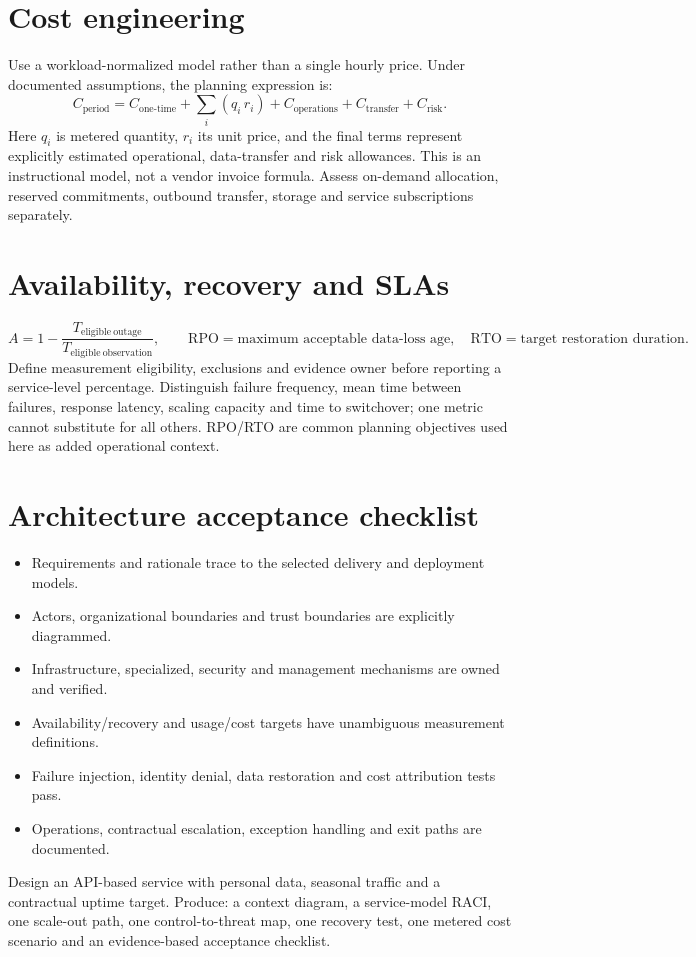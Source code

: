 \documentclass[10pt,letterpaper]{article}
\begin{document}
\section{Cost engineering}
Use a workload-normalized model rather than a single hourly price. Under documented assumptions, the planning expression is:
\[
 C_{\mathrm{period}}=C_{\mathrm{one\mbox{-}time}}+\sum_i (q_i\,r_i)
 +C_{\mathrm{operations}}+C_{\mathrm{transfer}}+C_{\mathrm{risk}}.
\]
Here $q_i$ is metered quantity, $r_i$ its unit price, and the final terms represent explicitly estimated operational, data-transfer and risk allowances. This is an instructional model, not a vendor invoice formula. Assess on-demand allocation, reserved commitments, outbound transfer, storage and service subscriptions separately.\\
\section{Availability, recovery and SLAs}
\[
 A=1-\frac{T_{\mathrm{eligible\ outage}}}{T_{\mathrm{eligible\ observation}}},\qquad
 \mathrm{RPO}=\text{maximum acceptable data-loss age},\quad
 \mathrm{RTO}=\text{target restoration duration}.
\]
Define measurement eligibility, exclusions and evidence owner before reporting a service-level percentage. Distinguish failure frequency, mean time between failures, response latency, scaling capacity and time to switchover; one metric cannot substitute for all others. RPO/RTO are common planning objectives used here as added operational context.\\
\section{Architecture acceptance checklist}
\begin{itemize}
\item Requirements and rationale trace to the selected delivery and deployment models.
\item Actors, organizational boundaries and trust boundaries are explicitly diagrammed.
\item Infrastructure, specialized, security and management mechanisms are owned and verified.
\item Availability/recovery and usage/cost targets have unambiguous measurement definitions.
\item Failure injection, identity denial, data restoration and cost attribution tests pass.
\item Operations, contractual escalation, exception handling and exit paths are documented.
\end{itemize}
\begin{workbox}[title={Integrated capstone}]
Design an API-based service with personal data, seasonal traffic and a contractual uptime target. Produce: a context diagram, a service-model RACI, one scale-out path, one control-to-threat map, one recovery test, one metered cost scenario and an evidence-based acceptance checklist.
\end{workbox}

\end{document}
